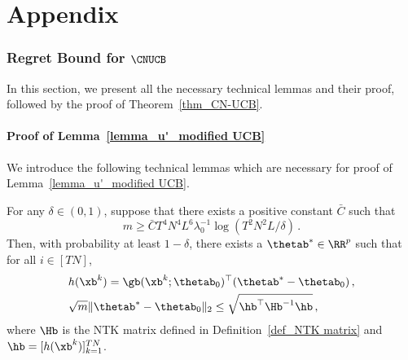 \documentclass{article}
\theoremstyle{plain}
\begin{document}
\printnomenclature


\newpage
\appendix
\onecolumn

\part{Appendix} %
\parttoc %

\section{Regret Bound for $\CNUCB$} \label{appx: regret bound for CN-UCB}
In this section, we present all the necessary technical lemmas and their proof, followed by the proof of Theorem~\ref{thm_CN-UCB}.

\subsection{Proof of Lemma~\ref{lemma_u'_modified UCB}}
We introduce the following technical lemmas which are necessary for proof of Lemma~\ref{lemma_u'_modified UCB}.

\begin{lemma}  \label{aux lemma:lemma 5.1 in NeuralUCB}
For any $\delta \in (0,1)$, suppose that there exists a positive constant $\bar{C}$ such that 
%
    \begin{equation*}
        m \ge \bar{C} T^4 N^4 L^6 \lambda_0^{-1} \log(T^2 N^2 L / \delta) \, .
    \end{equation*}
%
Then, with probability at least $1 - \delta$, there exists a $\thetab^* \in \RR^p$ such that for all $i \in [TN]$,
%
    \begin{align*}
        & h(\xb^k) = \gb(\xb^k; \thetab_0)^\top (\thetab^* - \thetab_0) \, ,
        \\
        & \sqrt{m} \| \thetab^* - \thetab_0 \|_2 \le \sqrt{\hb^\top \Hb^{-1} \hb} \, ,
    \end{align*}
%
where $\Hb$ is the NTK matrix defined in Definition~\ref{def_NTK matrix} and $\hb = [h(\xb^k)]_{k=1}^{TN}$.
\end{lemma}
\end{document}
